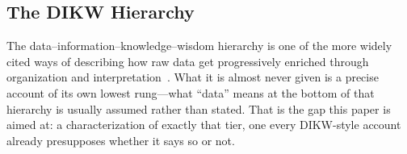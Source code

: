 \subsection{The DIKW Hierarchy}

The data--information--knowledge--wisdom hierarchy is one of the more
widely cited ways of describing how raw data get progressively enriched
through organization and interpretation~\autocite{ackoff1989,rowley2007}.
What it is almost never given is a precise account of its own lowest
rung---what ``data'' means at the bottom of that hierarchy is usually
assumed rather than stated. That is the gap this paper is aimed at: a
characterization of exactly that tier, one every DIKW-style account
already presupposes whether it says so or not.